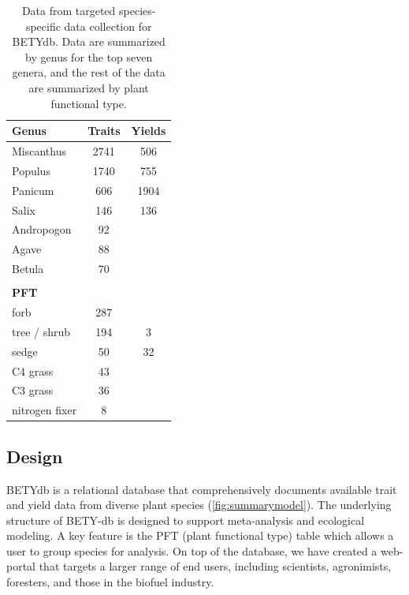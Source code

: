 \documentclass[10pt]{article}
\begin{document}
\begin{table}[hbt]
  \begin{tabular}{lcc}
    \hline
    \textbf{Genus} & \textbf{Traits} & \textbf{Yields} \\ 
    \hline \hline
    Miscanthus	&2741	&506\\
    Populus	&1740	&755\\
    Panicum	&606	&1904\\
    Salix	&146	&136\\
    Andropogon	&92	&\\
    Agave	&88	&\\
    Betula	&70	&\\\hline
    & & \\  \hline
    \textbf{PFT} & & \\ \hline
    forb	&287	&\\
    tree / shrub	&194	&3\\
    sedge &50 &32 \\
    C4 grass	&43	&\\
    C3 grass	&36	&\\
    nitrogen fixer	&8	&\\
    \hline
  \end{tabular}
  \caption[Species-specific data contained in BETYdb]{Data from targeted species-specific data collection for BETYdb. Data are summarized by genus for the top seven genera, and the rest of the data are summarized by plant functional type.}
  \label{tab:internaldata}
\end{table}


\subsection{Design}
 BETYdb is a relational database that comprehensively documents available trait and yield data from diverse plant species (\autoref{fig:summarymodel}).
 The underlying structure of BETY-db is designed to support meta-analysis and ecological modeling.
 A key feature is the PFT (plant functional type) table which allows a user to group species for analysis.
 On top of the database, we have created a web-portal that targets a larger range of end users, including scientists, agronimists, foresters, and those in the biofuel industry. 
\end{document}
